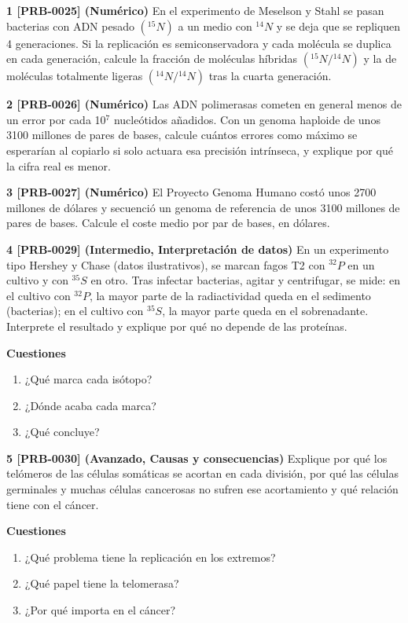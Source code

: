 \documentclass{book}
\begin{document}
\begin{tcolorbox}[title={Ejercicios}, studiumworked, breakable]

\noindent\textbf{1 [PRB-0025] (Numérico)}
En el experimento de Meselson y Stahl se pasan bacterias con ADN pesado \(({}^{15}N)\) a un medio con \({}^{14}N\) y se deja que se repliquen 4 generaciones. Si la replicación es semiconservadora y cada molécula se duplica en cada generación, calcule la fracción de moléculas híbridas \(({}^{15}N/{}^{14}N)\) y la de moléculas totalmente ligeras \(({}^{14}N/{}^{14}N)\) tras la cuarta generación.


\noindent\textbf{2 [PRB-0026] (Numérico)}
Las ADN polimerasas cometen en general menos de un error por cada 10\({}^{7}\) nucleótidos añadidos. Con un genoma haploide de unos 3100 millones de pares de bases, calcule cuántos errores como máximo se esperarían al copiarlo si solo actuara esa precisión intrínseca, y explique por qué la cifra real es menor.


\noindent\textbf{3 [PRB-0027] (Numérico)}
El Proyecto Genoma Humano costó unos 2700 millones de dólares y secuenció un genoma de referencia de unos 3100 millones de pares de bases. Calcule el coste medio por par de bases, en dólares.


\noindent\textbf{4 [PRB-0029] (Intermedio, Interpretación de datos)}
En un experimento tipo Hershey y Chase (datos ilustrativos), se marcan fagos T2 con \({}^{32}P\) en un cultivo y con \({}^{35}S\) en otro. Tras infectar bacterias, agitar y centrifugar, se mide: en el cultivo con \({}^{32}P\), la mayor parte de la radiactividad queda en el sedimento (bacterias); en el cultivo con \({}^{35}S\), la mayor parte queda en el sobrenadante. Interprete el resultado y explique por qué no depende de las proteínas.


\noindent\textbf{Cuestiones}
\begin{enumerate}
\item ¿Qué marca cada isótopo?
\item ¿Dónde acaba cada marca?
\item ¿Qué concluye?
\end{enumerate}

\noindent\textbf{5 [PRB-0030] (Avanzado, Causas y consecuencias)}
Explique por qué los telómeros de las células somáticas se acortan en cada división, por qué las células germinales y muchas células cancerosas no sufren ese acortamiento y qué relación tiene con el cáncer.


\noindent\textbf{Cuestiones}
\begin{enumerate}
\item ¿Qué problema tiene la replicación en los extremos?
\item ¿Qué papel tiene la telomerasa?
\item ¿Por qué importa en el cáncer?
\end{enumerate}


\end{tcolorbox}
\end{document}
